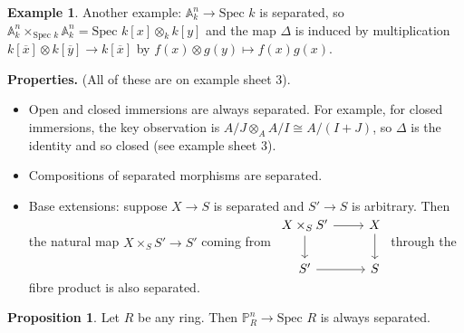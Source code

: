 \documentclass{article}
\theoremstyle{definition}
\newtheorem{prop}[theorem]{Proposition}
\newtheorem{example}{Example}[section]
\begin{document}
\begin{example}
    Another example: $\mathbb{A}_k^n \to \text{Spec }k$ is separated, so $\mathbb{A}_k^n \times_{\text{Spec }k}\mathbb{A}_k^n = \text{Spec }k[x]\otimes_k k[y]$ and the map $\Delta$ is induced by multiplication $k[\overline{x}]\otimes k[\overline{y}] \to k[\overline{x}]$ by $f(x)\otimes g(y) \mapsto f(x)g(x)$.  
\end{example}    
\textbf{Properties.} (All of these are on example sheet 3).
\begin{itemize}
    \item Open and closed immersions are always separated. For example, for closed immersions, the key observation is $A/J \otimes_A A/I \cong A/(I+J)$, so $\Delta$ is the identity and so closed (see example sheet 3).
    \item Compositions of separated morphisms are separated.
    \item Base extensions: suppose $X \to S$ is separated and $S' \to S$ is arbitrary. Then the natural map $X \times_S S' \to S'$ coming from $\begin{tikzcd}[]
        X \times_S S' & X\\
        S' & S
        \arrow["", from=1-2, to=2-2]
        \arrow["",from=1-1, to=2-1]
        \arrow["", from=2-1, to=2-2]
        \arrow["", from=1-1, to=1-2]
    \end{tikzcd}$ through the fibre product is also separated.
\end{itemize} 
\begin{prop}
    Let $R$ be any ring. Then $\mathbb{P}_R^n \to \text{Spec }R$ is always separated.
\end{prop}
\end{document}
